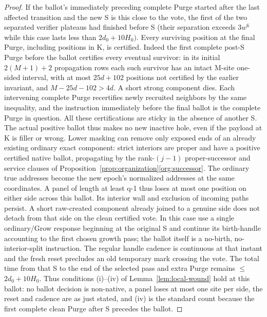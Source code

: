 \begin{proof}
If the ballot's immediately preceding complete Purge started after the last affected transition and the new S is this close to the vote, the first of the two separated verifier plateaus had finished before S (their separation exceeds \(3w^6\) while this case lasts less than \(2d_0+10H_0)\). Every surviving position at the final Purge, including positions in K, is certified. Indeed the first complete post-S Purge before the ballot certifies every eventual survivor: in its initial \(2(M+1)+2\) propagation rows each such survivor has an intact M-site one-sided interval, with at most \(25d+102\) positions not certified by the earlier invariant, and \(M- 25d- 102>4d\). A short strong component dies. Each intervening complete Purge recertifies newly recruited neighbors by the same inequality, and the instruction immediately before the final ballot is the complete Purge in question. All these certifications are sticky in the absence of another S. The actual positive ballot thus makes no new inactive hole, even if the payload at K is filler or wrong. Lower masking can remove only exposed ends of an already existing ordinary exact component: strict interiors are proper and have a positive certified native ballot, propagating by the rank-\((j-1)\) proper-successor and service clauses of Proposition~\ref{prop:organization}\ref{org:successor}. The ordinary true addresses become the new epoch's normalized addresses at the same coordinates. A panel of length at least q-1 thus loses at most one position on either side across this ballot. Its interior wall and exclusion of incoming paths persist. A short raw-created component already joined to a genuine side does not detach from that side on the clean certified vote. In this case use a single ordinary/Grow response beginning at the original S and continue its birth-handle accounting to the first chosen growth pass; the ballot itself is a no-birth, no-interior-split instruction. The regular handle cadence is continuous at that instant and the fresh reset precludes an old temporary mark crossing the vote. The total time from that S to the end of the selected pass and extra Purge remains \(\le\)\(2d_0+10H_0\). Thus conditions (i)--(iv) of Lemma~\ref{lem:local-wound} hold at this ballot: no ballot decision is non-native, a panel loses at most one site per side, the reset and cadence are as just stated, and (iv) is the standard count because the first complete clean Purge after S precedes the ballot.


\end{proof}
